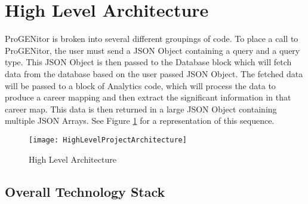 \section{High Level Architecture}
\label{sect:high-level-architecture}
ProGENitor is broken into several different groupings of code.  To place a call
to ProGENitor, the user must send a JSON Object containing a query and a query
type.  This JSON Object is then passed to the Database block which will fetch
data from the database based on the user passed JSON Object.  The fetched data
will be passed to a block of Analytics code, which will process the data to
produce a career mapping and then extract the significant information in that
career map.  This data is then returned in a large JSON Object containing multiple JSON
Arrays. See Figure
\ref{fig:HighLevelProjectArchitecture}
for a representation of this sequence.

\begin{figure}[H]
  \centering
  \texttt{[image: HighLevelProjectArchitecture]}
  \caption{High Level Architecture}
  \label{fig:HighLevelProjectArchitecture}
\end{figure}




\subsection{Overall Technology Stack}
